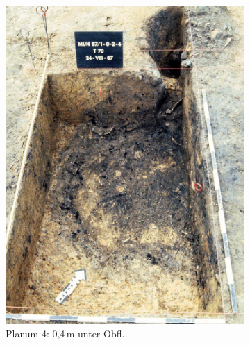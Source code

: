\begin{figure}[p]
\begin{subfigure}[t]{0.32\textwidth}
		\includegraphics[width = \textwidth]{fig/MUN87-102_Pl4_E87-041-13.jpg}
		\caption{Planum 4: 0,4\,m unter Obfl.}
		\label{fig:MUN87-1-0-2_Pl_4}
	\end{subfigure}
	\begin{subfigure}[t]{0.32\textwidth}
		\centering

\end{subfigure}
\end{figure}
